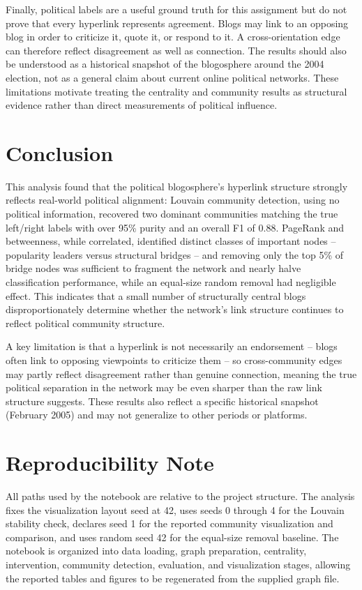\documentclass[conference]{IEEEtran}
\begin{document}
Finally, political labels are a useful ground truth for this assignment but do not prove that every hyperlink represents agreement. Blogs may link to an opposing blog in order to criticize it, quote it, or respond to it. A cross-orientation edge can therefore reflect disagreement as well as connection. The results should also be understood as a historical snapshot of the blogosphere around the 2004 election, not as a general claim about current online political networks. These limitations motivate treating the centrality and community results as structural evidence rather than direct measurements of political influence.

\section{Conclusion}
This analysis found that the political blogosphere's hyperlink structure strongly reflects real-world political alignment: Louvain community detection, using no political information, recovered two dominant communities matching the true left/right labels with over 95\% purity and an overall F1 of 0.88. PageRank and betweenness, while correlated, identified distinct classes of important nodes -- popularity leaders versus structural bridges -- and removing only the top 5\% of bridge nodes was sufficient to fragment the network and nearly halve classification performance, while an equal-size random removal had negligible effect. This indicates that a small number of structurally central blogs disproportionately determine whether the network's link structure continues to reflect political community structure.

A key limitation is that a hyperlink is not necessarily an endorsement -- blogs often link to opposing viewpoints to criticize them -- so cross-community edges may partly reflect disagreement rather than genuine connection, meaning the true political separation in the network may be even sharper than the raw link structure suggests. These results also reflect a specific historical snapshot (February 2005) and may not generalize to other periods or platforms.

\section{Reproducibility Note}
All paths used by the notebook are relative to the project structure. The analysis fixes the visualization layout seed at 42, uses seeds 0 through 4 for the Louvain stability check, declares seed 1 for the reported community visualization and comparison, and uses random seed 42 for the equal-size removal baseline. The notebook is organized into data loading, graph preparation, centrality, intervention, community detection, evaluation, and visualization stages, allowing the reported tables and figures to be regenerated from the supplied graph file.
\end{document}
